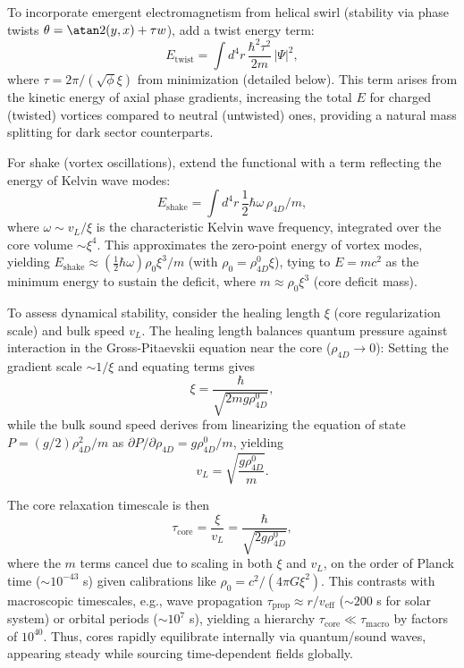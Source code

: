 To incorporate emergent electromagnetism from helical swirl (stability via phase twists $\theta = \atan2(y, x) + \tau w$), add a twist energy term:
\begin{equation}
E_{\text{twist}} = \int d^4 r \, \frac{\hbar^2 \tau^2}{2m} \, |\Psi|^2,
\end{equation}
where $\tau = 2\pi / (\sqrt{\phi} \xi)$ from minimization (detailed below). This term arises from the kinetic energy of axial phase gradients, increasing the total $E$ for charged (twisted) vortices compared to neutral (untwisted) ones, providing a natural mass splitting for dark sector counterparts.

For shake (vortex oscillations), extend the functional with a term reflecting the energy of Kelvin wave modes:
\begin{equation}
E_{\text{shake}} = \int d^4 r \, \frac{1}{2} \hbar \omega \, \rho_{4D} / m,
\end{equation}
where $\omega \sim v_L / \xi$ is the characteristic Kelvin wave frequency, integrated over the core volume $\sim \xi^4$. This approximates the zero-point energy of vortex modes, yielding $E_{\text{shake}} \approx (\frac{1}{2} \hbar \omega) \rho_0 \xi^3 / m$ (with $\rho_0 = \rho_{4D}^0 \xi$), tying to $E = m c^2$ as the minimum energy to sustain the deficit, where $m \approx \rho_0 \xi^3$ (core deficit mass).

To assess dynamical stability, consider the healing length $\xi$ (core regularization scale) and bulk speed $v_L$. The healing length balances quantum pressure against interaction in the Gross-Pitaevskii equation near the core ($\rho_{4D} \to 0$): Setting the gradient scale $\sim 1/\xi$ and equating terms gives
\begin{equation}
\xi = \frac{\hbar}{\sqrt{2 m g \rho_{4D}^0}},
\end{equation}
while the bulk sound speed derives from linearizing the equation of state $P = (g/2) \rho_{4D}^2 / m$ as $\partial P / \partial \rho_{4D} = g \rho_{4D}^0 / m$, yielding
\begin{equation}
v_L = \sqrt{\frac{g \rho_{4D}^0}{m}}.
\end{equation}

The core relaxation timescale is then
\begin{equation}
\tau_{\text{core}} = \frac{\xi}{v_L} = \frac{\hbar}{\sqrt{2 g \rho_{4D}^0}},
\end{equation}
where the $m$ terms cancel due to scaling in both $\xi$ and $v_L$, on the order of Planck time ($\sim 10^{-43}$ s) given calibrations like $\rho_0 = c^2 / (4\pi G \xi^2)$. This contrasts with macroscopic timescales, e.g., wave propagation $\tau_{\text{prop}} \approx r / v_{\text{eff}}$ ($\sim 200$ s for solar system) or orbital periods ($\sim 10^7$ s), yielding a hierarchy $\tau_{\text{core}} \ll \tau_{\text{macro}}$ by factors of $10^{40}$. Thus, cores rapidly equilibrate internally via quantum/sound waves, appearing steady while sourcing time-dependent fields globally.

